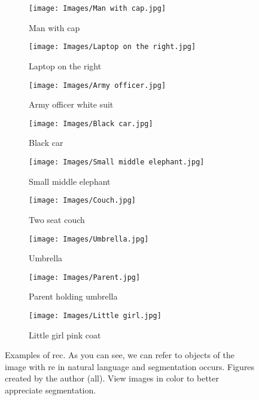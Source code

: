 \begin{figure}[p]
  \centering
  \begin{subfigure}[t]{.32\textwidth}
    \centering
    \caption{Man with cap}\label{fig:rec-man}
    \texttt{[image: Images/Man with cap.jpg]}
  \end{subfigure}\hfill
  \begin{subfigure}[t]{.32\textwidth}
    \centering
    \caption{Laptop on the right}\label{fig:rec-laptop}
    \texttt{[image: Images/Laptop on the right.jpg]}
  \end{subfigure}\hfill
  \begin{subfigure}[t]{.32\textwidth}
    \centering
    \caption{Army officer white suit}\label{fig:rec-army}
    \texttt{[image: Images/Army officer.jpg]}
  \end{subfigure}

  \bigskip
  \begin{subfigure}[t]{.32\textwidth}
    \centering
    \caption{Black car}\label{fig:rec-car}
    \texttt{[image: Images/Black car.jpg]}
  \end{subfigure}\hfill
  \begin{subfigure}[t]{.32\textwidth}
    \centering
    \caption{Small middle elephant}\label{fig:rec-elephant}
    \texttt{[image: Images/Small middle elephant.jpg]}
  \end{subfigure}\hfill
  \begin{subfigure}[t]{.32\textwidth}
    \centering
    \caption{Two seat couch}\label{fig:rec-couch}
    \texttt{[image: Images/Couch.jpg]}
  \end{subfigure}

  \bigskip
  \begin{subfigure}[t]{.32\textwidth}
    \centering
    \caption{Umbrella}\label{fig:rec-umbrella}
    \texttt{[image: Images/Umbrella.jpg]}
  \end{subfigure}\hfill
  \begin{subfigure}[t]{.32\textwidth}
    \centering
    \caption{Parent holding umbrella}\label{fig:rec-parent}
    \texttt{[image: Images/Parent.jpg]}
  \end{subfigure}\hfill
  \begin{subfigure}[t]{.32\textwidth}
    \centering
    \caption{Little girl pink coat}\label{fig:rec-girl}
    \texttt{[image: Images/Little girl.jpg]}
  \end{subfigure}
  \caption[Examples of ]{Examples of \acl{rec}. As you can
    see, we can refer to objects of the image with \gls{re} in natural language
    and segmentation occurs. Figures created by the author (all). View images
    in color to better appreciate segmentation.}%
  \label{fig:rec-examples}
\end{figure}



